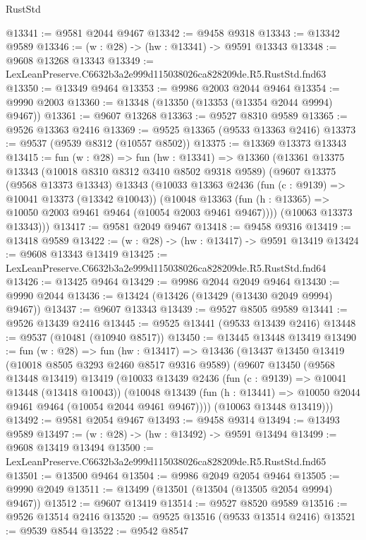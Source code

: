 \begin{lexlean}{RustStd}
\begin{coremodule}
@13341 := @9581 @2044 @9467
@13342 := @9458 @9318
@13343 := @13342 @9589
@13346 := (w : @28) -> (hw : @13341) -> @9591 @13343
@13348 := @9608 @13268 @13343
@13349 := LexLeanPreserve.C6632b3a2e999d115038026ca828209de.R5.RustStd.fnd63
@13350 := @13349 @9464
@13353 := @9986 @2003 @2044 @9464
@13354 := @9990 @2003
@13360 := @13348 (@13350 (@13353 (@13354 @2044 @9994) @9467))
@13361 := @9607 @13268
@13363 := @9527 @8310 @9589
@13365 := @9526 @13363 @2416
@13369 := @9525 @13365 (@9533 @13363 @2416)
@13373 := @9537 (@9539 @8312 (@10557 @8502))
@13375 := @13369 @13373 @13343
@13415 := fun (w : @28) =>
  fun (hw : @13341) =>
  @13360
    (@13361
      @13375
      @13343
      (@10018 @8310 @8312 @3410 @8502 @9318 @9589)
      (@9607
        @13375
        (@9568 @13373 @13343)
        @13343
        (@10033
          @13363
          @2436
          (fun (c : @9139) => @10041 @13373 (@13342 @10043))
          (@10048 @13363 (fun (h : @13365) => @10050 @2003 @9461 @9464 (@10054 @2003 @9461 @9467))))
        (@10063 @13373 @13343)))
@13417 := @9581 @2049 @9467
@13418 := @9458 @9316
@13419 := @13418 @9589
@13422 := (w : @28) -> (hw : @13417) -> @9591 @13419
@13424 := @9608 @13343 @13419
@13425 := LexLeanPreserve.C6632b3a2e999d115038026ca828209de.R5.RustStd.fnd64
@13426 := @13425 @9464
@13429 := @9986 @2044 @2049 @9464
@13430 := @9990 @2044
@13436 := @13424 (@13426 (@13429 (@13430 @2049 @9994) @9467))
@13437 := @9607 @13343
@13439 := @9527 @8505 @9589
@13441 := @9526 @13439 @2416
@13445 := @9525 @13441 (@9533 @13439 @2416)
@13448 := @9537 (@10481 (@10940 @8517))
@13450 := @13445 @13448 @13419
@13490 := fun (w : @28) =>
  fun (hw : @13417) =>
  @13436
    (@13437
      @13450
      @13419
      (@10018 @8505 @3293 @2460 @8517 @9316 @9589)
      (@9607
        @13450
        (@9568 @13448 @13419)
        @13419
        (@10033
          @13439
          @2436
          (fun (c : @9139) => @10041 @13448 (@13418 @10043))
          (@10048 @13439 (fun (h : @13441) => @10050 @2044 @9461 @9464 (@10054 @2044 @9461 @9467))))
        (@10063 @13448 @13419)))
@13492 := @9581 @2054 @9467
@13493 := @9458 @9314
@13494 := @13493 @9589
@13497 := (w : @28) -> (hw : @13492) -> @9591 @13494
@13499 := @9608 @13419 @13494
@13500 := LexLeanPreserve.C6632b3a2e999d115038026ca828209de.R5.RustStd.fnd65
@13501 := @13500 @9464
@13504 := @9986 @2049 @2054 @9464
@13505 := @9990 @2049
@13511 := @13499 (@13501 (@13504 (@13505 @2054 @9994) @9467))
@13512 := @9607 @13419
@13514 := @9527 @8520 @9589
@13516 := @9526 @13514 @2416
@13520 := @9525 @13516 (@9533 @13514 @2416)
@13521 := @9539 @8544
@13522 := @9542 @8547

\end{coremodule}
\end{lexlean}
